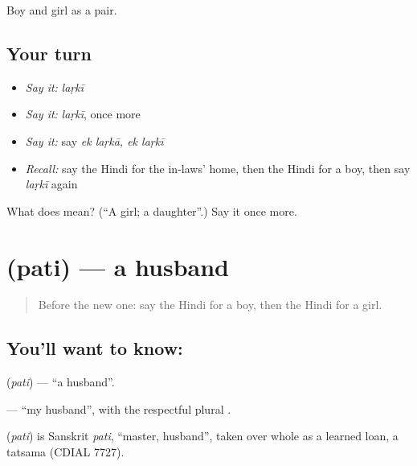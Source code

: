 \begin{grammarlens}[title={What you've built}]
Boy and girl as a pair.
\end{grammarlens}

\subsection*{Your turn}
\begin{itemize}
\raggedright
  \item \emph{Say it:} \emph{laṛkī}
  \item \emph{Say it:} \emph{laṛkī}, once more
  \item \emph{Say it:} say \emph{ek laṛkā, ek laṛkī}
  \item \emph{Recall:} say the Hindi for the in-laws' home, then the Hindi for a boy, then say \emph{laṛkī} again
\end{itemize}

\begin{tcolorbox}[breakable,colback=teal!4,colframe=teal!35!black,title={Before you move on}]
What does  mean? (\textquotedblleft{}A girl; a daughter\textquotedblright{}.) Say it once more.
\end{tcolorbox}
\section[\texorpdfstring{\hi{पति} (pati)}{पति (pati)}]{ (pati) — a husband}

\label{lesson:HI-C118-pati}



\begin{quote}
Before the new one: say the Hindi for a boy, then the Hindi for a girl.
\end{quote}

\subsection*{You'll want to know: }
\textbf{} (\emph{pati}) — \textquotedblleft{}a husband\textquotedblright{}.

\textbf{ } — \textquotedblleft{}my husband\textquotedblright{}, with the respectful plural \textbf{}.

\begin{cousinweb}
\textbf{} (\emph{pati}) is Sanskrit \emph{pati}, \textquotedblleft{}master, husband\textquotedblright{}, taken over whole as a learned loan, a tatsama (CDIAL 7727).
\end{cousinweb}

